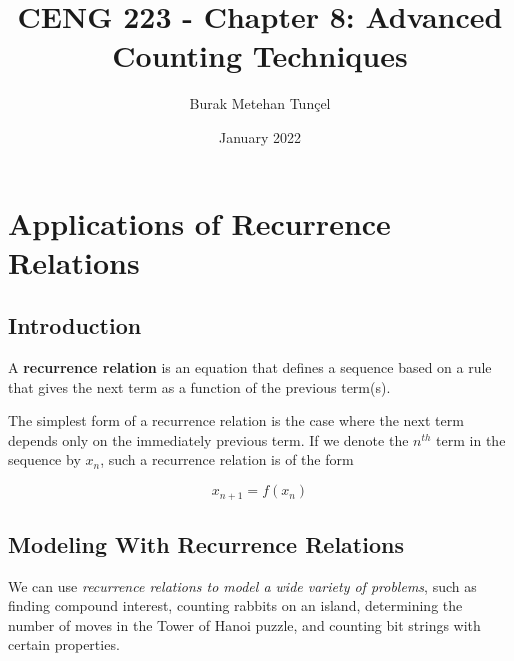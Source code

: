 \documentclass[11pt]{article}
\title{CENG 223 - Chapter 8: Advanced Counting Techniques}
\author{Burak Metehan Tunçel}
\date{January 2022}
\begin{document}
\maketitle
\section{Applications of Recurrence Relations}

\subsection{Introduction}

A \textbf{recurrence relation} is an equation that defines a sequence based on a rule that gives the next term as a function of the previous term(s).

The simplest form of a recurrence relation is the case where the next term depends only on the immediately previous term. If we denote the $n^{th}$ term in the sequence by $x_n$, such a recurrence relation is of the form

\begin{equation*}
    x_{n+1} = f(x_n)
\end{equation*}


\subsection{Modeling With Recurrence Relations}

We can use \textit{recurrence relations to model a wide variety of problems}, such as finding compound interest, counting rabbits on an island, determining the number of moves in the Tower of Hanoi puzzle, and counting bit strings with certain properties.
\end{document}
